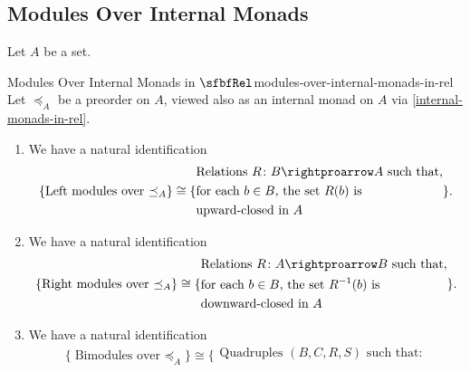 \subsection{Modules Over Internal Monads}\label{subsection-modules-over-internal-monads-in-rel}
Let $A$ be a set.
\begin{proposition}{Modules Over Internal Monads in $\sfbfRel$}{modules-over-internal-monads-in-rel}%
    Let $\preceq_{A}$ be a preorder on $A$, viewed also as an internal monad on $A$ via \cref{internal-monads-in-rel}.
    \begin{enumerate}
        \item\label{modules-over-internal-monads-in-rel-left-modules}We have a natural identification%
            \[
                \{\text{Left modules over $\mathord{\preceq_{A}}$}\}%
                \cong
                \{%
                    \begin{aligned}
                        &\text{Relations $R\colon B\rightproarrow A$ such that,}\\%
                        &\text{for each $b\in B$, the set $R(b)$ is}\\%
                        &\text{upward-closed in $A$}%
                    \end{aligned}
                \}.%
            \]%
        \item\label{modules-over-internal-monads-in-rel-right-modules}We have a natural identification%
            \[
                \{\text{Right modules over $\mathord{\preceq_{A}}$}\}%
                \cong
                \{%
                    \begin{aligned}
                        &\text{Relations $R\colon A\rightproarrow B$ such that,}\\%
                        &\text{for each $b\in B$, the set $R^{-1}(b)$ is}\\%
                        &\text{downward-closed in $A$}%
                    \end{aligned}
                \}.%
            \]%
        \item\label{modules-over-internal-monads-in-rel-bimodules}We have a natural identification
            \[
                \{\text{Bimodules over $\mathord{\preceq_{A}}$}\}%
                \cong
                \{%
                    \begin{gathered}
                        \text{Quadruples $(B,C,R,S)$ such that:}\\%

\end{gathered}\]
\end{enumerate}
\end{proposition}
